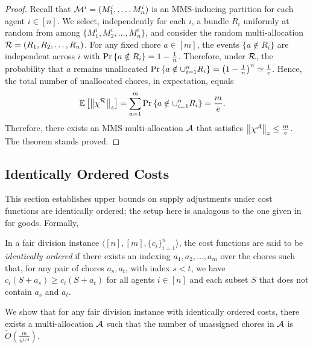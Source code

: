 \begin{proof}
    Recall that $\mathcal{M}^i=(M^i_1,\ldots,M^i_n)$ is an MMS-inducing partition for each agent $i \in [n]$. We select, independently for each $i$, a bundle $R_i$ uniformly at random from among $\{M^i_1, M^i_2, \dots,M^i_n\}$, and consider the random multi-allocation $\mathcal{R}=(R_1,R_2,\dots,R_n)$. For any fixed chore $a\in[m]$, the events $\{a\notin R_i\}$ are independent across $i$ with $\Pr \left\{a\notin R_i\right\}=1-\frac{1}{n}$. Therefore, under $\mathcal{R}$, the probability that $a$ remains unallocated  $\Pr \left\{a\notin\cup_{i=1}^n R_i\right\}=\left(1-\frac{1}{n}\right)^n \simeq \frac{1}{e}$. Hence, the total number of unallocated chores, in expectation, equals 
    \begin{align*}
    \mathbb{E}\left[\left\|\chi^{\mathcal{R}}\right\|_z\right]
    &= \sum_{a=1}^m \Pr \left\{a\notin\cup_{i=1}^n R_i\right\} = \frac{m}{e}.
    \end{align*} 
    Therefore, there exists an MMS multi-allocation $\mathcal{A}$ that satisfies $\left\|\chi^{\mathcal{A}}\right\|_z\leq \frac{m}{e}$. The theorem stands proved. 
\end{proof}




\subsection{Identically Ordered Costs}
\label{subsec:ordered-costs}
This section establishes upper bounds on supply adjustments under cost functions are identically ordered; the setup here is analogous to the one given in  for goods. Formally, 

\begin{definition} \label{def:identically-ordered-costs}
In a fair division instance $\langle [n], [m], \{c_i\}_{i=1}^n \rangle$, the cost functions are said to be \textit{identically ordered} if there exists an indexing $a_1, a_2, \ldots, a_m$ over the chores such that, for any pair of chores $a_s, a_t$, with index $s < t$, we have $c_i(S + a_s) \geq c_i(S + a_t)$ for all agents $i \in [n]$ and each subset $S$ that does not contain $a_s$ and $a_t$.  
\end{definition}

We show that for any fair division instance with identically ordered costs, there exists a multi-allocation $\mathcal{A}$ such that the number of unassigned chores in $\mathcal{A}$ is $\widetilde{O} \left(\frac{m}{n^{1/4}} \right)$.



